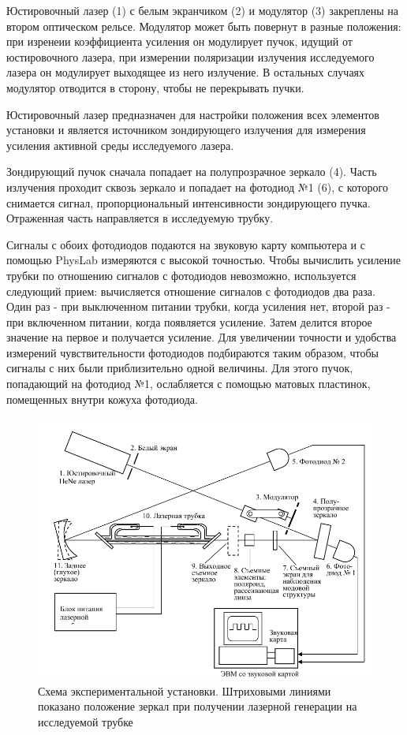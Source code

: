 \documentclass[a4paper,12pt]{article}
\begin{document}
Юстировочный лазер (1) с белым экранчиком (2) и модулятор (3) закреплены на втором оптическом рельсе. Модулятор может быть повернут в разные положения: при изренеии коэффициента усиления он модулирует пучок, идущий от юстировочного лазера, при измерении поляризации излучения исследуемого лазера он модулирует выходящее из него излучение. В остальных случаях модулятор отводится в сторону, чтобы не перекрывать пучки.

Юстировочный лазер предназначен для настройки положения всех элементов установки и является источником зондирующего излучения для измерения усиления активной среды исследуемого лазера.

Зондирующий пучок сначала попадает на полупрозрачное зеркало (4). Часть излучения проходит сквозь зеркало и попадает на фотодиод №1 (6), с которого снимается сигнал, пропорциональный интенсивности зондирующего пучка. Отраженная часть направляется в исследуемую трубку.

Сигналы с обоих фотодиодов подаются на звуковую карту компьютера и с помощью PhysLab измеряются с высокой точностью. Чтобы вычислить усиление трубки по отношению сигналов с фотодиодов невозможно, используется следующий прием: вычисляется отношение сигналов с фотодиодов два раза. Один раз - при выключенном питании трубки, когда усиления нет, второй раз - при включенном питании, когда появляется усиление. Затем делится второе значение на первое и получается усиление. Для увеличении точности и удобства измерений чувствительности фотодиодов подбираются таким образом, чтобы сигналы с них были приблизительно одной величины. Для этого пучок, попадающий на фотодиод №1, ослабляется с помощью матовых пластинок, помещенных внутри кожуха фотодиода.

\begin{figure}[h]
\centering
\includegraphics[width=0.7\linewidth]{img3.png}
\caption{Схема экспериментальной установки. Штриховыми линиями показано положение зеркал при получении лазерной генерации на исследуемой трубке}
\label{img3}
\end{figure}
\end{document}
